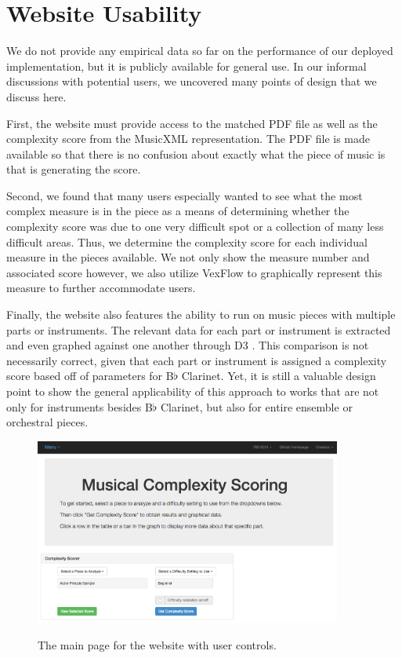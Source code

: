 \documentclass[12pt]{report}
\begin{document}
\section{Website Usability} 
\label{sec:usability}

We do not provide any empirical data so far on the performance of our deployed implementation, but it is publicly available for general use. In our informal discussions with potential users, we uncovered many points of design that we discuss here.

First, the website must provide access to the matched PDF file as well as the complexity score from the MusicXML representation. The PDF file is made available so that there is no confusion about exactly what the piece of music is that is generating the score.

Second, we found that many users especially wanted to see what the most complex measure is in the piece as a means of determining whether the complexity score was due to one very difficult spot or a collection of many less difficult areas. Thus, we determine the complexity score for each individual measure in the pieces available. We not only show the measure number and associated score however, we also utilize VexFlow \cite{VexFlow} to graphically represent this measure to further accommodate users.

Finally, the website also features the ability to run on music pieces with multiple parts or instruments. The relevant data for each part or instrument is extracted and even graphed against one another through D3 \cite{D3}. This comparison is not necessarily correct, given that each part or instrument is assigned a complexity score based off of parameters for B$\flat$ Clarinet. Yet, it is still a valuable design point to show the general applicability of this approach to works that are not only for instruments besides B$\flat$ Clarinet, but also for entire ensemble or orchestral pieces.

\begin{figure}
	\centering
		\caption{The main page for the website with user controls.}
		\includegraphics[width=0.9\textwidth]{WebsiteLandingInput.png}
		\label{image:websitemain}
\end{figure}
\end{document}
